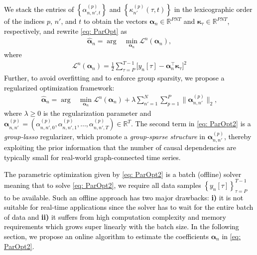 \documentclass[conference]{IEEEtran}
\def\cbr#1{\left\lbrace #1 \right\rbrace}
\def\sbr#1{\biggl [ #1 \biggr ]}
\def\nbr#1{\left( #1\right)}
\def\bs #1{\boldsymbol{#1}}
\newcommand{\cB}[1]{\textcolor{black}{#1}}
\def\p {{(p)}}
\def\n {{n'}}
\begin{document}
\cB{We stack the entries of $\cbr{{\alpha}^\p_{n,n',t}}$ and $\cbr{\kappa^\p_{n'}\nbr{\tau,t}}$ in the lexicographic order of the indices $p$, $\n$, and $t$ to obtain the vectors $\bs {\alpha}_n\in \mathbb{R}^{PNT}$ and $\boldsymbol{\kappa}_\tau\in \mathbb{R}^{PNT}$, respectively, and rewrite \eqref{eq: ParOpt} as
 \begin{align} \label{eq: ParOpt2}
\widehat{\bs{\alpha}}_n=
\arg &\min_{\bs\alpha_{n}}  \mathcal{L}^n\nbr{\bs{\alpha}_{n}},
\end{align}
where
 \begin{align} \label{eq: ls4}
\mathcal{L}^n(\bs{\alpha}_n)=\frac{1}{2}\sum_{\tau=P}^{T-1}\sbr{y_{n}[\tau]- \bs{\alpha}_{n}^\top\bs{\kappa}_\tau}^2
\end{align}
Further, to avoid overfitting and to enforce group sparsity, we propose a regularized optimization framework:
 \begin{align} \label{eq: ParOpt2}
\widehat{\bs{\alpha}}_n=
\arg &\min_{\bs\alpha_{n}}  \mathcal{L}^n\nbr{\bs{\alpha}_{n}}+\lambda \sum_{\n = 1}^{N} \sum_{p = 1}^{P}\| \bs{\alpha}_{n,n'}^\p \|_2,
\end{align}
where $\lambda\geq0$ is the regularization parameter and $\bs{\alpha}_{n,n'}^\p =(\alpha_{n,n',0}^\p,\alpha_{n,n',1}^\p,\dots,\alpha_{n,n',T}^\p)\in \mathbb{R}^T.$
The second term in \eqref{eq: ParOpt2} is a \textit{group-lasso} regularizer, which promote a \textit{group-sparse structure} in $\bs{\alpha}_{n,n'}^\p$, thereby exploiting the prior information that the number of causal dependencies are typically small for  real-world graph-connected time series.}

\cB{The parametric optimization given by \eqref{eq: ParOpt2} is a batch (offline) solver meaning that to solve \eqref{eq: ParOpt2}, we require all data samples $\cbr{y_n[\tau]}_{\tau=P}^{T-1}$ to be available. Such an offline approach has two major drawbacks: \textbf{i)} it is not suitable for real-time applications since the solver has to wait for the entire batch of data and \textbf{ii)} it suffers from high computation complexity and memory requirements which grows super linearly with the batch size. In the following section, we propose an online algorithm to estimate the coefficients $\bs{\alpha}_{n}$ in \eqref{eq: ParOpt2}.}
\end{document}
